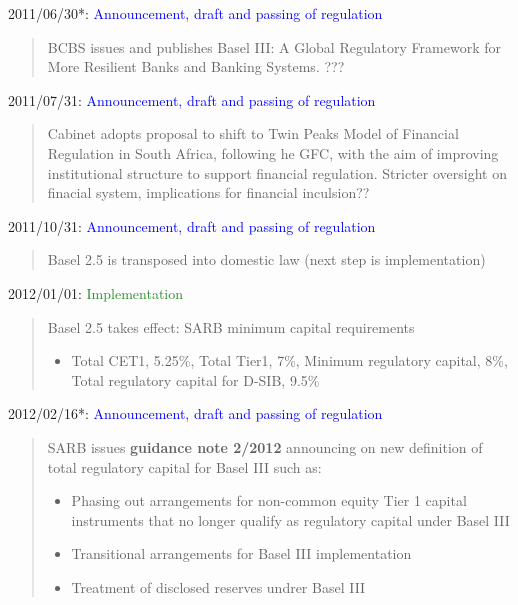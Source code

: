 \documentclass[
  letterpaper,
  DIV=11,
  numbers=noendperiod]{scrartcl}
\begin{document}
2011/06/30*:
\textcolor{blue}{Announcement, draft and passing of regulation}

\begin{quote}BCBS issues and publishes Basel III: A Global Regulatory Framework for More Resilient Banks and Banking Systems. ???
\end{quote}

2011/07/31:
\textcolor{blue}{Announcement, draft and passing of regulation}

\begin{quote} 
Cabinet adopts proposal to shift to Twin Peaks Model of Financial Regulation in South Africa, following he GFC, with the aim of improving  institutional structure to support financial regulation. Stricter oversight on finacial system, implications for financial inculsion??
\end{quote}

2011/10/31:
\textcolor{blue}{Announcement, draft and passing of regulation}

\begin{quote}
Basel 2.5 is transposed into domestic law (next step is implementation)
\end{quote}

2012/01/01: \textcolor{ForestGreen}{Implementation}

\begin{quote}
    Basel 2.5 takes effect: SARB minimum capital requirements
    \begin{itemize}
        \item Total CET1, 5.25\%, Total Tier1, 7\%, Minimum regulatory capital, 8\%, Total regulatory capital for D-SIB, 9.5\%
    \end{itemize}
\end{quote}

2012/02/16*:
\textcolor{blue}{Announcement, draft and passing of regulation}

\begin{quote}
SARB issues \textbf{guidance note 2/2012} announcing on new definition of total regulatory capital for Basel III such as:
\begin{itemize}
    \item Phasing out arrangements for non-common equity Tier 1 capital instruments that no longer qualify as regulatory capital under Basel III
 \item Transitional arrangements for Basel III implementation
\item Treatment of disclosed reserves undrer Basel III
\end{itemize}
\end{quote}
\end{document}
